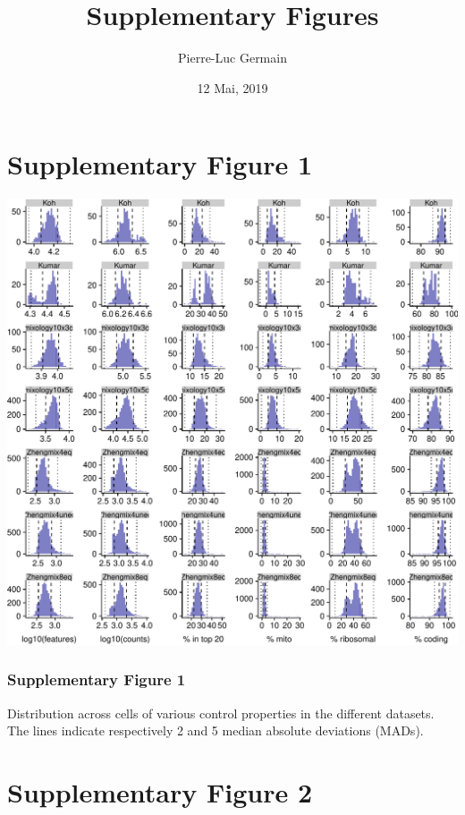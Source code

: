 \documentclass[]{article}
\title{Supplementary Figures}
\author{Pierre-Luc Germain}
\date{12 Mai, 2019}
\begin{document}
\maketitle

{
\setcounter{tocdepth}{2}
\tableofcontents
}
\newpage

\hypertarget{supplementary-figure-1}{%
\section{Supplementary Figure 1}\label{supplementary-figure-1}}

\includegraphics{supp_figures_files/figure-latex/dist_cell_properties-1.pdf}

\vfill

\hypertarget{supplementary-figure-1-1}{%
\subsubsection{Supplementary Figure 1}\label{supplementary-figure-1-1}}

Distribution across cells of various control properties in the different
datasets. The lines indicate respectively 2 and 5 median absolute
deviations (MADs).

\newpage

\hypertarget{supplementary-figure-2}{%
\section{Supplementary Figure 2}\label{supplementary-figure-2}}
\end{document}
